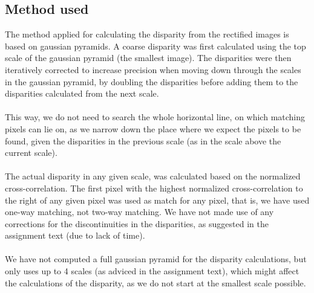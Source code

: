 \documentclass[12pt,a4paper,oneside,final]{article}
\begin{document}
\subsection{Method used}
The method applied for calculating the disparity from the rectified images is based on gaussian pyramids. A coarse disparity was first calculated using the top scale of the gaussian pyramid (the smallest image). The disparities were then iteratively corrected to increase precision when moving down through the scales in the gaussian pyramid, by doubling the disparities before adding them to the disparities calculated from the next scale. \\\\
This way, we do not need to search the whole horizontal line, on which matching pixels can lie on, as we narrow down the place where we expect the pixels to be found, given the disparities in the previous scale (as in the scale above the current scale).\\\\
The actual disparity in any given scale, was calculated based on the normalized cross-correlation. The first pixel with the highest normalized cross-correlation to the right of any given pixel was used as match for any pixel, that is, we have used one-way matching, not two-way matching. We have not made use of any corrections for the discontinuities in the disparities, as suggested in the assignment text (due to lack of time). \\\\
We have not computed a full gaussian pyramid for the disparity calculations, but only uses up to 4 scales (as adviced in the assignment text), which might affect the calculations of the disparity, as we do not start at the smallest scale possible.
\end{document}
